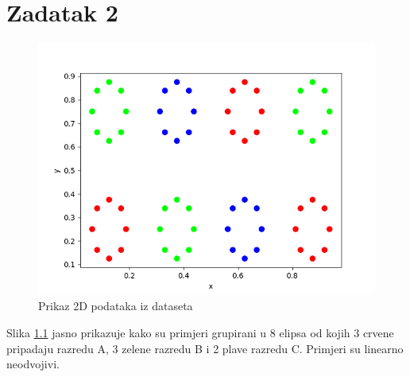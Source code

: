 \documentclass[times, utf8, seminar]{fer}
\begin{document}
\chapter{Zadatak 2}
\begin{figure}[H]
    \centering
    \includegraphics[scale=0.75]{img/zad_2.png}
    \caption[Caption for LOF]{Prikaz 2D podataka iz dataseta\footnotemark}
    \label{zad2:img}
\end{figure}
Slika \ref{zad2:img} jasno prikazuje kako su primjeri grupirani u 8 elipsa od kojih 3 crvene pripadaju razredu A, 3 zelene razredu B i 2 plave razredu C. Primjeri su linearno neodvojivi. 
\end{document}
